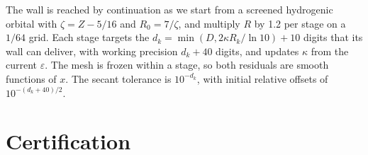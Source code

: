 \documentclass[aps,pra,reprint,superscriptaddress,amsmath,amssymb,longbibliography]{revtex4-2}
\begin{document}
The wall is reached by continuation as we start from a screened hydrogenic orbital with $\zeta=Z-5/16$ and $R_0=7/\zeta$, and multiply $R$ by 1.2 per stage on a $1/64$ grid. Each stage targets the $d_k=\min(D,2\kappa R_k/\ln10)+10$ digits that its wall can deliver, with working precision $d_k+40$ digits, and updates $\kappa$ from the current $\varepsilon$. The mesh is frozen within a stage, so both residuals are smooth functions of $x$. The secant tolerance is $10^{-d_k}$, with initial relative offsets of $10^{-(d_k+40)/2}$.

\section{Certification}\label{sec:certify}
\end{document}
